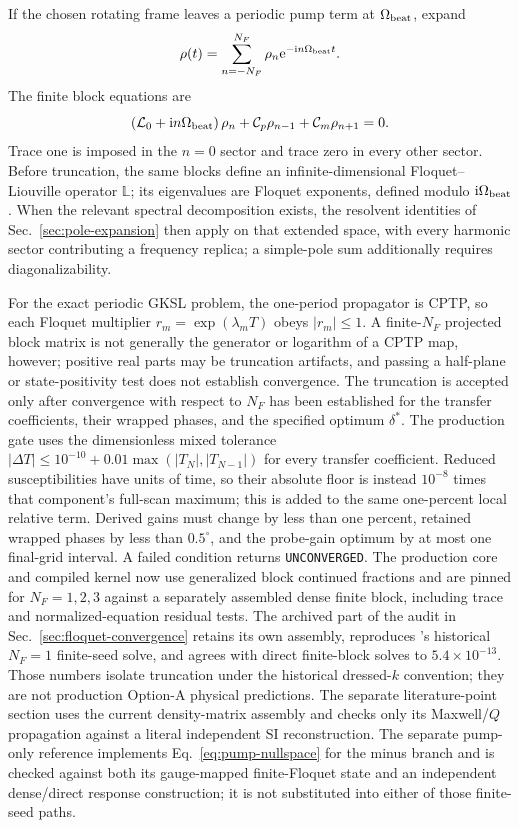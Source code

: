 \documentclass[11pt,a4paper]{article}
\newcommand{\ii}{\mathrm i}
\newcommand{\e}{\mathrm e}
\begin{document}
If the chosen rotating frame leaves a periodic pump term at
$\Omega_{\rm beat}$, expand
\[
\rho(t)=\sum_{n=-N_F}^{N_F}\rho_n\e^{-\ii n\Omega_{\rm beat}t}.
\]
The finite block equations are
\begin{equation}
\left(\mathcal L_0+\ii n\Omega_{\rm beat}\right)\rho_n
+\mathcal C_p\rho_{n-1}+\mathcal C_m\rho_{n+1}=0 .
\label{eq:floquet-block}
\end{equation}
Trace one is imposed in the $n=0$ sector and trace zero in every other sector.
Before truncation, the same blocks define an infinite-dimensional
Floquet--Liouville operator $\mathbb L$; its eigenvalues are Floquet exponents,
defined modulo $\ii\Omega_{\rm beat}$. When the relevant spectral decomposition
exists, the resolvent identities of Sec.~\ref{sec:pole-expansion} then apply on
that extended space, with every harmonic sector contributing a frequency
replica; a simple-pole sum additionally requires diagonalizability.

For the exact periodic GKSL problem, the one-period propagator is CPTP, so each
Floquet multiplier $r_m=\exp(\lambda_mT)$ obeys $|r_m|\leq1$. A finite-$N_F$
projected block matrix is not generally the generator or logarithm of a CPTP
map, however; positive real parts may be truncation artifacts, and passing a
half-plane or state-positivity test does not establish convergence. The
truncation is accepted only after convergence with respect to $N_F$ has been
established for the transfer coefficients, their wrapped phases, and the
specified optimum $\delta^*$.
The production gate uses the dimensionless mixed tolerance
$|\Delta T|\leq10^{-10}+0.01\max(|T_N|,|T_{N-1}|)$ for every transfer
coefficient. Reduced susceptibilities have units of time, so their absolute
floor is instead $10^{-8}$ times that component's full-scan maximum; this is
added to the same one-percent local relative term. Derived gains must change by
less than one percent, retained wrapped phases by less than $0.5^\circ$, and the
probe-gain optimum by at most one final-grid interval. A failed condition returns
\texttt{UNCONVERGED}.
The production core and compiled kernel now use generalized block continued
fractions and are pinned for $N_F=1,2,3$ against a separately assembled dense
finite block, including trace and normalized-equation residual tests. The
archived part of the audit in Sec.~\ref{sec:floquet-convergence} retains its own
assembly, reproduces 's historical $N_F=1$ finite-seed
solve, and agrees with direct finite-block solves to $5.4\times10^{-13}$. Those
numbers isolate truncation under the historical dressed-$k$ convention; they are not production
Option-A physical predictions. The separate literature-point section uses the
current density-matrix assembly and checks only its Maxwell/$Q$ propagation
against a literal independent SI reconstruction. The separate pump-only
reference implements Eq.~\eqref{eq:pump-nullspace} for the minus branch and is
checked against both its gauge-mapped finite-Floquet state and an independent
dense/direct response construction; it is not substituted into either of those
finite-seed paths.
\end{document}
